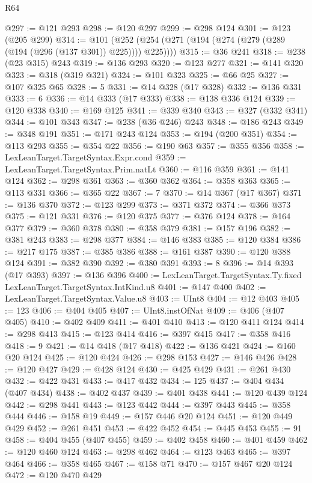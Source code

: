\begin{lexlean}{R64}
\begin{coremodule}
@297 := @121 @293
@298 := @120 @297
@299 := @298 @124
@301 := @123 (@205 @299)
@314 := @101 (@252 (@254 (@271 (@194 (@274 (@279 (@289 (@194 (@296 (@137 @301)) @225)))) @225))))
@315 := @36 @241
@318 := @238 (@23 @315) @243
@319 := @136 @293
@320 := @123 @277
@321 := @141 @320
@323 := @318 (@319 @321)
@324 := @101 @323
@325 := @66 @25
@327 := @107 @325 @65
@328 := 5
@331 := @14 @328 (@17 @328)
@332 := @136 @331
@333 := 6
@336 := @14 @333 (@17 @333)
@338 := @138 @336 @124
@339 := @120 @338
@340 := @169 @125
@341 := @339 @340
@343 := @327 (@332 @341)
@344 := @101 @343
@347 := @238 (@36 @246) @243
@348 := @186 @243
@349 := @348 @191
@351 := @171 @243 @124
@353 := @194 (@200 @351)
@354 := @113 @293
@355 := @354 @22
@356 := @190 @63
@357 := @355 @356
@358 := LexLeanTarget.TargetSyntax.Expr.cond
@359 := LexLeanTarget.TargetSyntax.Prim.natLt
@360 := @116 @359
@361 := @141 @124
@362 := @298 @361
@363 := @360 @362
@364 := @358 @363
@365 := @113 @331
@366 := @365 @22
@367 := 7
@370 := @14 @367 (@17 @367)
@371 := @136 @370
@372 := @123 @299
@373 := @371 @372
@374 := @366 @373
@375 := @121 @331
@376 := @120 @375
@377 := @376 @124
@378 := @164 @377
@379 := @360 @378
@380 := @358 @379
@381 := @157 @196
@382 := @381 @243
@383 := @298 @377
@384 := @146 @383
@385 := @120 @384
@386 := @217 @175
@387 := @385 @386
@388 := @161 @387
@390 := @120 @388 @124
@391 := @382 @390
@392 := @380 @391
@393 := 8
@396 := @14 @393 (@17 @393)
@397 := @136 @396
@400 := LexLeanTarget.TargetSyntax.Ty.fixed LexLeanTarget.TargetSyntax.IntKind.u8
@401 := @147 @400
@402 := LexLeanTarget.TargetSyntax.Value.u8
@403 := UInt8
@404 := @12 @403
@405 := 123
@406 := @404 @405
@407 := UInt8.instOfNat
@409 := @406 (@407 @405)
@410 := @402 @409
@411 := @401 @410
@413 := @120 @411 @124
@414 := @298 @413
@415 := @123 @414
@416 := @397 @415
@417 := @358 @416
@418 := 9
@421 := @14 @418 (@17 @418)
@422 := @136 @421
@424 := @160 @20 @124
@425 := @120 @424
@426 := @298 @153
@427 := @146 @426
@428 := @120 @427
@429 := @428 @124
@430 := @425 @429
@431 := @261 @430
@432 := @422 @431
@433 := @417 @432
@434 := 125
@437 := @404 @434 (@407 @434)
@438 := @402 @437
@439 := @401 @438
@441 := @120 @439 @124
@442 := @298 @441
@443 := @123 @442
@444 := @397 @443
@445 := @358 @444
@446 := @158 @19
@449 := @157 @446 @20 @124
@451 := @120 @449 @429
@452 := @261 @451
@453 := @422 @452
@454 := @445 @453
@455 := 91
@458 := @404 @455 (@407 @455)
@459 := @402 @458
@460 := @401 @459
@462 := @120 @460 @124
@463 := @298 @462
@464 := @123 @463
@465 := @397 @464
@466 := @358 @465
@467 := @158 @71
@470 := @157 @467 @20 @124
@472 := @120 @470 @429

\end{coremodule}
\end{lexlean}
